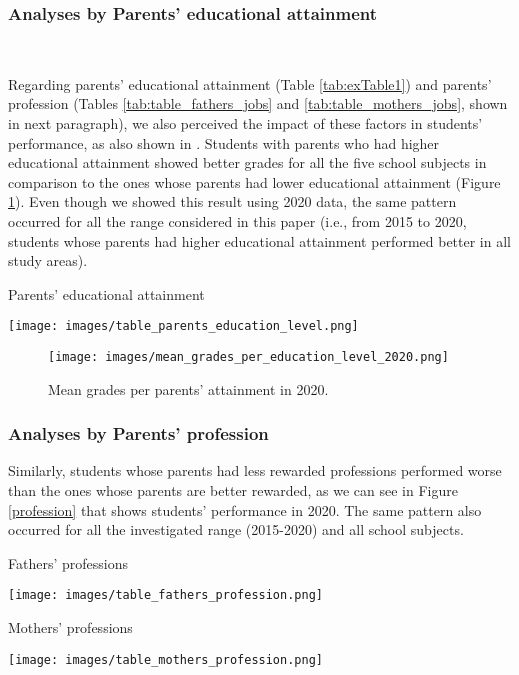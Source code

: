 \documentclass[12pt]{article}
\begin{document}
\subsubsection{Analyses by Parents' educational attainment}\

Regarding parents' educational attainment (Table \ref{tab:exTable1}) and parents' profession (Tables \ref{tab:table_fathers_jobs} and \ref{tab:table_mothers_jobs}, shown in next paragraph), we also perceived the impact of these factors in students' performance, as also shown in \cite{Farooq2012FACTORSAS}. Students with parents who had higher educational attainment showed better grades for all the five school subjects in comparison to the ones whose parents had lower educational attainment (Figure \ref{education}). Even though we showed this result using 2020 data, the same pattern occurred for all the range considered in this paper (i.e., from 2015 to 2020, students whose parents had higher educational attainment performed better in all study areas).  


\begin{table}[ht]
\centering
\caption{Parents' educational attainment}
\label{tab:exTable1}
\texttt{[image: images/table\_parents\_education\_level.png]}
\end{table}


\begin{figure}[h!]
\centerline{\texttt{[image: images/mean\_grades\_per\_education\_level\_2020.png]}}
\caption{Mean grades per parents' attainment in 2020.} 
\label{education}
\end{figure}

\subsubsection{Analyses by Parents' profession}

Similarly, students whose parents had less rewarded professions performed worse than the ones whose parents are better rewarded, as we can see in Figure \ref{profession} that shows students' performance in 2020. The same pattern also occurred for all the investigated range (2015-2020) and all school subjects.  

\begin{table}[ht]
\centering
\caption{Fathers' professions}
\label{tab:table_fathers_jobs}
\texttt{[image: images/table\_fathers\_profession.png]}
\end{table}

\begin{table}[ht]
\centering
\caption{Mothers' professions}
\label{tab:table_mothers_jobs}
\texttt{[image: images/table\_mothers\_profession.png]}
\end{table}
\end{document}

